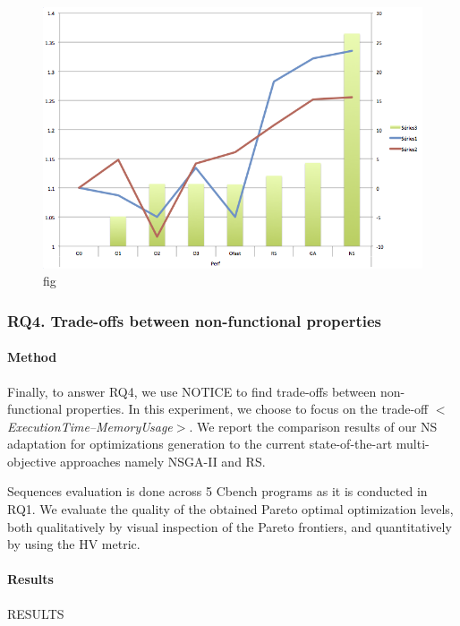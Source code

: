 \begin{figure}[h]
	\centering
	\includegraphics[width=1.\linewidth]{Ressources/rq3.png}
	\caption{fig}
\end{figure}

\noindent{}
\subsubsection{RQ4. Trade-offs between non-functional properties}
\paragraph{Method}

Finally, to answer RQ4, we use NOTICE to find trade-offs between non-functional properties. In this experiment, we choose to focus on the trade-off \textit{$<$ExecutionTime--MemoryUsage$>$}. We report the comparison results of our NS adaptation for optimizations generation to the current state-of-the-art multi-objective approaches namely NSGA-II and RS. 
  
Sequences evaluation is done across 5 Cbench programs as it is conducted in RQ1.
We evaluate the quality of the obtained Pareto optimal optimization levels, both qualitatively by visual inspection of the Pareto frontiers, and quantitatively by using the HV metric.



\paragraph{Results}
RESULTS


